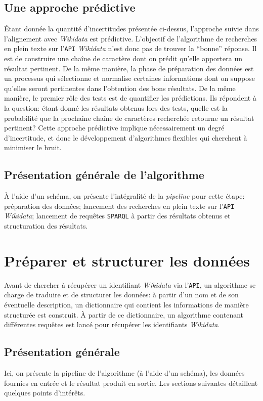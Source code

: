 \documentclass[a4paper, 12pt, twoside]{book}
\newcommand{\api}{\texttt{API}}
\newcommand{\sparql}{\texttt{SPARQL}}
\newcommand{\wkd}{\textit{Wikidata}}
\begin{document}
\subsection{Une approche prédictive}
Étant donnée la quantité d'incertitudes présentée ci-dessus, l'approche suivie dans l'alignement avec \wkd{} est prédictive. L'objectif de l'algorithme de recherches en plein texte sur l'\api{} \wkd{} n'est donc pas de trouver la \enquote{bonne} réponse. Il est de construire une chaîne de caractère dont on prédit qu'elle apportera un résultat pertinent. De la même manière, la phase de préparation des données est un processus qui sélectionne et normalise certaines informations dont on suppose qu'elles seront pertinentes dans l'obtention des bons résultats. De la même manière, le premier rôle des tests est de quantifier les prédictions. Ils répondent à la question: étant donné les résultats obtenus lors des tests, quelle est la probabilité que la prochaine chaîne de caractères recherchée retourne un résultat pertinent? Cette approche prédictive implique nécessairement un degré d'incertitude, et donc le développement d'algorithmes flexibles qui cherchent à minimiser le bruit.

\subsection{Présentation générale de l'algorithme}
À l'aide d'un schéma, on présente l'intégralité de la \textit{pipeline} pour cette étape: préparation des données; lancement des recherches en plein texte sur l'\api{} \wkd{}; lancement de requêtes \sparql{} à partir des résultats obtenus et structuration des résultats. 

\section{Préparer et structurer les données}
Avant de chercher à récupérer un identifiant \wkd{} via l'\api{}, un algorithme se charge de traduire et de structurer les données: à partir d'un nom et de son éventuelle description, un dictionnaire qui contient les informations de manière structurée est construit. À partir de ce dictionnaire, un algorithme contenant différentes requêtes est lancé pour récupérer les identifiants \wkd{}.

\subsection{Présentation générale}
Ici, on présente la pipeline de l'algorithme (à l'aide d'un schéma), les données fournies en entrée et le résultat produit en sortie. Les sections suivantes détaillent quelques points d'intérêts.
\end{document}
